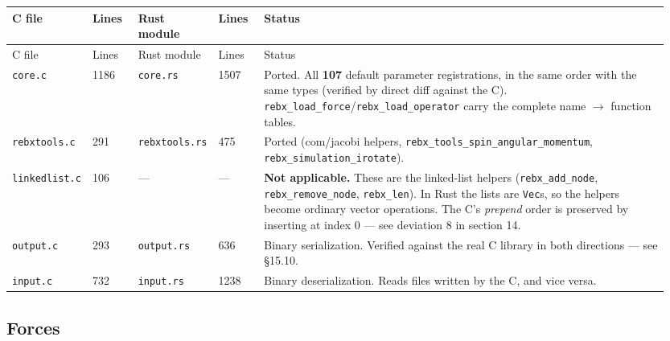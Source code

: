 \documentclass[11pt]{article}
\begin{document}
\begin{longtable}{L{0.077\linewidth}L{0.077\linewidth}L{0.077\linewidth}L{0.077\linewidth}L{0.641\linewidth}}
\toprule
C file & Lines & Rust module & Lines & Status \\
\midrule
\endfirsthead
\toprule
C file & Lines & Rust module & Lines & Status \\
\midrule
\endhead
\texttt{core.c} & 1186 & \texttt{core.rs} & 1507 & Ported. All \textbf{107} default parameter registrations, in the same order with the same types (verified by direct diff against the C). \texttt{rebx\_load\_force}/\texttt{rebx\_load\_operator} carry the complete name \(\rightarrow\) function tables. \\
\texttt{rebxtools.c} & 291 & \texttt{rebxtools.rs} & 475 & Ported (com/jacobi helpers, \texttt{rebx\_tools\_spin\_angular\_momentum}, \texttt{rebx\_simulation\_irotate}). \\
\texttt{linkedlist.c} & 106 & --- & --- & \textbf{Not applicable.} These are the linked-list helpers (\texttt{rebx\_add\_node}, \texttt{rebx\_remove\_node}, \texttt{rebx\_len}). In Rust the lists are \texttt{Vec}s, so the helpers become ordinary vector operations. The C's \emph{prepend} order is preserved by inserting at index 0 --- see deviation 8 in section 14. \\
\texttt{output.c} & 293 & \texttt{output.rs} & 636 & Binary serialization. Verified against the real C library in both directions --- see \S{}15.10. \\
\texttt{input.c} & 732 & \texttt{input.rs} & 1238 & Binary deserialization. Reads files written by the C, and vice versa. \\
\bottomrule
\end{longtable}

\subsection{Forces}
\end{document}
